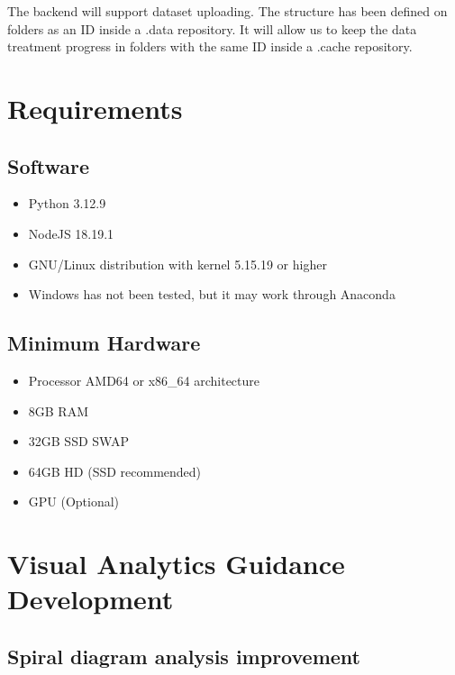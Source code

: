 \documentclass[a4paper]{article}
\begin{document}
The backend will support dataset uploading. The structure has been defined on folders as an ID inside a .data repository. It will allow us to keep the data treatment progress in folders with the same ID inside a .cache repository.

\section{Requirements}
\label{sec:org71317b5}

\subsection{Software}
\label{sec:org1ea8b40}

\begin{itemize}
\item Python 3.12.9

\item NodeJS 18.19.1

\item GNU/Linux distribution with kernel 5.15.19 or higher

\item Windows has not been tested, but it may work through Anaconda
\end{itemize}

\subsection{Minimum Hardware}
\label{sec:orgdb10fe5}

\begin{itemize}
\item Processor AMD64 or x86\_64 architecture

\item 8GB RAM

\item 32GB SSD SWAP

\item 64GB HD (SSD recommended)

\item GPU (Optional)
\end{itemize}

\section{Visual Analytics Guidance Development}
\label{sec:org1e56fa9}

\subsection{Spiral diagram analysis improvement}
\label{sec:org60cbf03}
\end{document}

